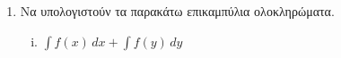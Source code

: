 








\begin{center}
\end{center}

\vspace{\baselineskip}

\begin{enumerate}
	\item Να υπολογιστούν τα παρακάτω επικαμπύλια ολοκληρώματα.

		\begin{enumerate}[i)]
			\item $ \int f(x) \,{dx} + \int f(y) \,{dy} $
		\end{enumerate}

\end{enumerate}




